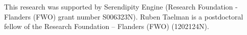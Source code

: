 \begin{acknowledgments}
	This research was supported by Serendipity Engine (Research Foundation - Flanders (FWO) grant number S006323N).
	Ruben Taelman is a postdoctoral fellow of the Research Foundation – Flanders (FWO) (1202124N).
\end{acknowledgments}
